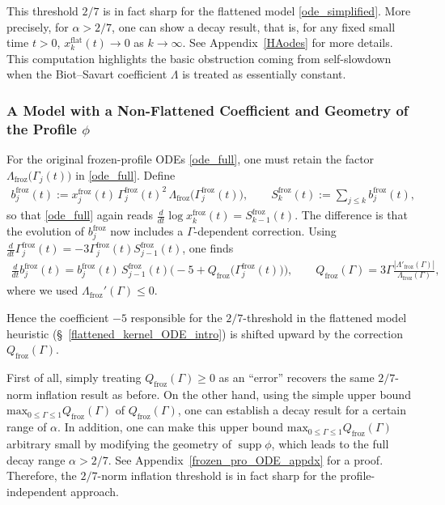 \documentclass[reqno,11pt]{amsart}
\newcommand{\supp}{\operatorname{supp}}
\begin{document}
This threshold $2/7$ is in fact sharp for the flattened model \eqref{ode_simplified}. More precisely, for $\alpha>2/7$, one can show a decay result, that is, for any fixed small time $t>0$, $x_k^{\mathrm{flat}}(t) \to 0$ as $k\to\infty$. See Appendix~\ref{HAodes} for more details.
This computation highlights the basic obstruction coming from self-slowdown when the
Biot--Savart coefficient $\Lambda$ is treated as essentially constant.

\subsubsection{A Model with a Non-Flattened Coefficient and Geometry of the Profile $\phi$}
\label{variable_coeff_intro}
For the original frozen-profile ODEs \eqref{ode_full}, one must retain the factor $\Lambda_{\mathrm{froz}}\big(\Gamma_j(t)\big)$ in
\eqref{ode_full}. Define
\begin{align}
\label{eq:orig_def_bj_froz}
    b_j^{\mathrm{froz}}(t):=x_j^{\mathrm{froz}}(t)\,\Gamma_j^{\mathrm{froz}}(t)^2\,\Lambda_{\mathrm{froz}}\big(\Gamma_j^{\mathrm{froz}}(t)\big),
    \qquad
    S_k^{\mathrm{froz}}(t):=\sum_{j\le k} b_j^{\mathrm{froz}}(t),
\end{align}
so that \eqref{ode_full} again reads $\frac{d}{dt}\log x_k^{\mathrm{froz}}(t)=S_{k-1}^{\mathrm{froz}}(t)$.
The difference is that the evolution of $b_j^{\mathrm{froz}}$ now includes a $\Gamma$-dependent
correction. Using $\frac{d}{dt}\Gamma_j^{\mathrm{froz}}(t)= -3\Gamma_j^{\mathrm{froz}}(t)S_{j-1}^{\mathrm{froz}}(t)$, one finds
\begin{align}
\label{eq:log_der_cor}
    \frac{d}{dt}b_j^{\mathrm{froz}}(t)
    =
    b_j^{\mathrm{froz}}(t)\,S_{j-1}^{\mathrm{froz}}(t)
    \Big(
        -5
        + Q_{\mathrm{froz}}\big(\Gamma_j^{\mathrm{froz}}(t))
    \Big),
    \qquad
    Q_{\mathrm{froz}}(\Gamma)= 3\Gamma\frac{|\Lambda'_{\mathrm{froz}}(\Gamma)|}{\Lambda_{\mathrm{froz}}(\Gamma)},
\end{align}
where we used $\Lambda_{\mathrm{froz}}'(\Gamma)\le 0$.

Hence the coefficient $-5$ responsible for the $2/7$-threshold in the flattened model heuristic (\S~\ref{flattened_kernel_ODE_intro}) is shifted upward by the  correction $Q_{\mathrm{froz}}(\Gamma)$. 

First of all, simply treating
$Q_{\mathrm{froz}}(\Gamma)\geq 0$ as an ``error'' recovers the same $2/7$-norm inflation result as before. 
On the other hand, using the simple upper bound $\mathrm{max}_{0\leq \Gamma \leq 1} Q_{\mathrm{froz}}(\Gamma)$ of $Q_{\mathrm{froz}}(\Gamma)$, one can establish a decay result for a certain range of $\alpha$. In addition, one can make this upper bound $\mathrm{max}_{0\leq \Gamma \leq 1} Q_{\mathrm{froz}}(\Gamma)$ arbitrary small by modifying the geometry of $\supp \phi$, which leads to the full decay range $\alpha>2/7$. See Appendix~\ref{frozen_pro_ODE_appdx} for a proof. 
Therefore, the $2/7$-norm inflation threshold is in fact sharp for the profile-independent approach. 
\end{document}
